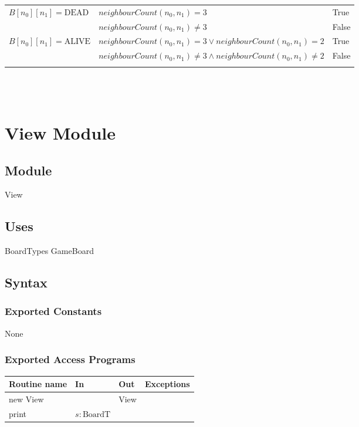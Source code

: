 \documentclass[12pt]{article}
\begin{document}
\begin{tabular}{|p{4cm}|p{7cm}|p{4.5cm}|}
\hhline{|-|-|-|}
$B[n_0][n_1] =  \mbox{DEAD}$ & $neighbourCount(n_0,n_1) = 3$ & True  \\
\hhline{|~|-|-|}
 & $neighbourCount(n_0,n_1) \ne 3$ & False\\
\hhline{|-|-|-|}
$B[n_0][n_1] =  \mbox{ALIVE}$ & $neighbourCount(n_0,n_1)= 3 
\lor neighbourCount(n_0,n_1) = 2 $ & True\\
\hhline{|~|-|-|}
&$neighbourCount(n_0,n_1) \neq 3 
\wedge neighbourCount(n_0,n_1) \neq 2 $ & False\\
\hhline{|-|-|-|}
\end{tabular}\\\\

\newpage

\section* {View Module}

\subsection* {Module}

View

\subsection* {Uses}

BoardTypes
GameBoard

\subsection* {Syntax}

\subsubsection* {Exported Constants}

None

\subsubsection* {Exported Access Programs}

\begin{tabular}{| l | l | l | l |}
\hline
\textbf{Routine name} & \textbf{In} & \textbf{Out} & \textbf{Exceptions}\\
\hline
new View &  & View & ~\\
\hline
print & $s: \mbox{BoardT}$ & ~ & ~\\
\hline

\end{tabular}
\end{document}
